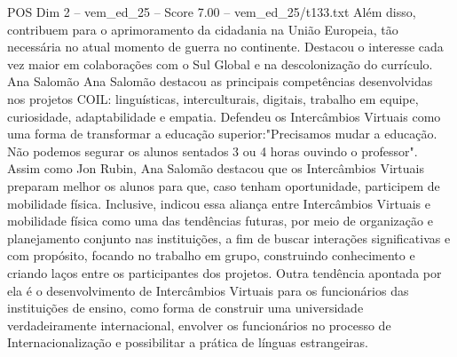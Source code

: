 \begin{textsample}{POS Dim 2 – vem\_ed\_25 – Score 7.00 – vem\_ed\_25/t133.txt}
Além disso, contribuem para o aprimoramento da cidadania na União Europeia, tão necessária no atual momento de guerra no continente.
Destacou o interesse cada vez maior em colaborações com o Sul Global e na descolonização do currículo.
Ana Salomão Ana Salomão destacou as principais competências desenvolvidas nos projetos COIL: linguísticas, interculturais, digitais, trabalho em equipe, curiosidade, adaptabilidade e empatia.
Defendeu os Intercâmbios Virtuais como uma forma de transformar a educação superior:"Precisamos mudar a educação.
Não podemos segurar os alunos sentados 3 ou 4 horas ouvindo o professor".
Assim como Jon Rubin, Ana Salomão destacou que os Intercâmbios Virtuais preparam melhor os alunos para que, caso tenham oportunidade, participem de mobilidade física.
Inclusive, indicou essa aliança entre Intercâmbios Virtuais e mobilidade física como uma das tendências futuras, por meio de organização e planejamento conjunto nas instituições, a fim de buscar interações significativas e com propósito, focando no trabalho em grupo, construindo conhecimento e criando laços entre os participantes dos projetos.
Outra tendência apontada por ela é o desenvolvimento de Intercâmbios Virtuais para os funcionários das instituições de ensino, como forma de construir uma universidade verdadeiramente internacional, envolver os funcionários no processo de Internacionalização e possibilitar a prática de línguas estrangeiras.

\end{textsample}
